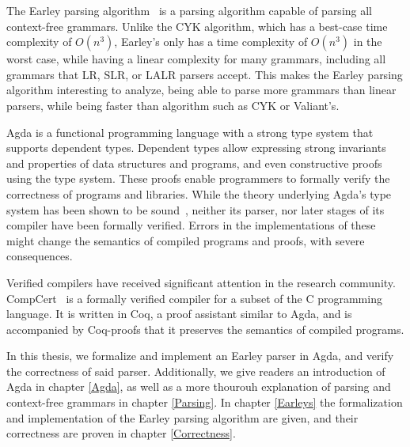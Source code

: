 	The Earley parsing algorithm~\cite{Earley} is a parsing algorithm capable
	of parsing all context-free grammars. Unlike the CYK algorithm, which has a
	best-case time complexity of $O(n^3)$, Earley's only has a time complexity
	of $O(n^3)$ in the worst case, while having a linear complexity for many
	grammars, including all grammars that LR, SLR, or LALR parsers accept. This
	makes the Earley parsing algorithm interesting to analyze, being able to
	parse more grammars than linear parsers, while being faster than algorithm
	such as CYK or Valiant's.

	Agda is a functional programming language with a strong type system that
	supports dependent types. Dependent types allow expressing strong
	invariants and properties of data structures and programs, and even
	constructive proofs using the type system. These proofs enable programmers
	to formally verify the correctness of programs and libraries. While the
	theory underlying Agda's type system has been shown to be sound~\cite{?},
	neither its parser, nor later stages of its compiler have been formally
	verified. Errors in the implementations of these might change the semantics
	of compiled programs and proofs, with severe consequences.

	Verified compilers have received significant attention in the research
	community. CompCert~\cite{Leroy} is a formally verified compiler for a
	subset of the C programming language. It is written in Coq, a proof
	assistant similar to Agda, and is accompanied by Coq-proofs that it
	preserves the semantics of compiled programs. 

	In this thesis, we formalize and implement an Earley parser in Agda, and
	verify the correctness of said parser. Additionally, we give readers an
	introduction of Agda in chapter \ref{Agda}, as well as a more thourouh
	explanation of parsing and context-free grammars in chapter \ref{Parsing}.
	In chapter \ref{Earleys} the formalization and implementation of the Earley
	parsing algorithm are given, and their correctness are proven in chapter
	\ref{Correctness}.
